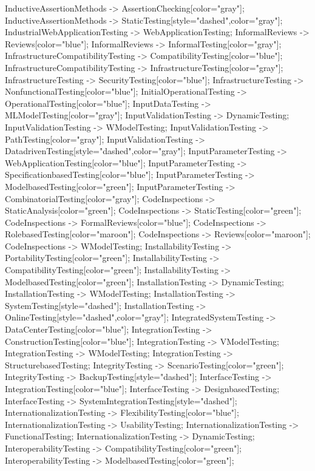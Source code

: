 \documentclass{article}
\begin{document}
{InductiveAssertionMethods -> AssertionChecking[color="gray"];
InductiveAssertionMethods -> StaticTesting[style="dashed",color="gray"];
IndustrialWebApplicationTesting -> WebApplicationTesting;
InformalReviews -> Reviews[color="blue"];
InformalReviews -> InformalTesting[color="gray"];
InfrastructureCompatibilityTesting -> CompatibilityTesting[color="blue"];
InfrastructureCompatibilityTesting -> InfrastructureTesting[color="gray"];
InfrastructureTesting -> SecurityTesting[color="blue"];
InfrastructureTesting -> NonfunctionalTesting[color="blue"];
InitialOperationalTesting -> OperationalTesting[color="blue"];
InputDataTesting -> MLModelTesting[color="gray"];
InputValidationTesting -> DynamicTesting;
InputValidationTesting -> WModelTesting;
InputValidationTesting -> PathTesting[color="gray"];
InputValidationTesting -> DatadrivenTesting[style="dashed",color="gray"];
InputParameterTesting -> WebApplicationTesting[color="blue"];
InputParameterTesting -> SpecificationbasedTesting[color="blue"];
InputParameterTesting -> ModelbasedTesting[color="green"];
InputParameterTesting -> CombinatorialTesting[color="gray"];
CodeInspections -> StaticAnalysis[color="green"];
CodeInspections -> StaticTesting[color="green"];
CodeInspections -> FormalReviews[color="blue"];
CodeInspections -> RolebasedTesting[color="maroon"];
CodeInspections -> Reviews[color="maroon"];
CodeInspections -> WModelTesting;
InstallabilityTesting -> PortabilityTesting[color="green"];
InstallabilityTesting -> CompatibilityTesting[color="green"];
InstallabilityTesting -> ModelbasedTesting[color="green"];
InstallationTesting -> DynamicTesting;
InstallationTesting -> WModelTesting;
InstallationTesting -> SystemTesting[style="dashed"];
InstallationTesting -> OnlineTesting[style="dashed",color="gray"];
IntegratedSystemTesting -> DataCenterTesting[color="blue"];
IntegrationTesting -> ConstructionTesting[color="blue"];
IntegrationTesting -> VModelTesting;
IntegrationTesting -> WModelTesting;
IntegrationTesting -> StructurebasedTesting;
IntegrityTesting -> ScenarioTesting[color="green"];
IntegrityTesting -> BackupTesting[style="dashed"];
InterfaceTesting -> IntegrationTesting[color="blue"];
InterfaceTesting -> DesignbasedTesting;
InterfaceTesting -> SystemIntegrationTesting[style="dashed"];
InternationalizationTesting -> FlexibilityTesting[color="blue"];
InternationalizationTesting -> UsabilityTesting;
InternationalizationTesting -> FunctionalTesting;
InternationalizationTesting -> DynamicTesting;
InteroperabilityTesting -> CompatibilityTesting[color="green"];
InteroperabilityTesting -> ModelbasedTesting[color="green"];
}
\end{document}
